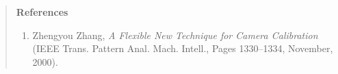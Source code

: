 \documentclass[12pt]{article}
\begin{document}
\begin{quote}
{\bf References }

\begin{enumerate}
\item Zhengyou Zhang, {\it A Flexible New Technique for Camera Calibration\/} (IEEE Trans. Pattern Anal. Mach. Intell., Pages 1330--1334, November, 2000).

\end{enumerate}
\end{quote}

%
%
\end{document}
